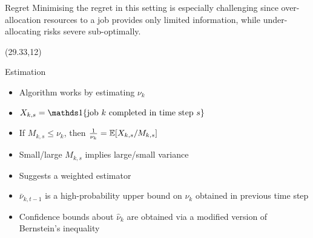 \documentclass[nofooter,landscape,scale=1.4]{poster}
\begin{document}
\begin{frame}
\begin{textblock}{25.33}
\begin{block}{Regret}
Minimising the regret in this setting is especially challenging since
over-allocation resources to a job provides only limited information, while under-allocating risks severe sub-optimally.
\end{block}

\end{textblock}

\begin{textblock}{25.33}(29.33,12)
\begin{block}{Estimation}
\begin{itemize}
\item Algorithm works by estimating $\nu_k$ 
\item $X_{k,s} = \ind{\text{job } k \text{ completed in time step } s}$
\item If $M_{k,s} \leq \nu_k$, then ${1 \over \nu_k} = \mathbb E[X_{k,s} / M_{k,s}]$
\item Small/large $M_{k,s}$ implies large/small variance
\item Suggests a weighted estimator
\item $\bar \nu_{k,t-1}$ is a high-probability upper bound on $\nu_k$ obtained in previous time step
\item Confidence bounds about $\hat \nu_k$ are obtained via a modified version of Bernstein's inequality
\end{itemize}
\end{block}


\end{textblock}
\end{frame}
\end{document}
